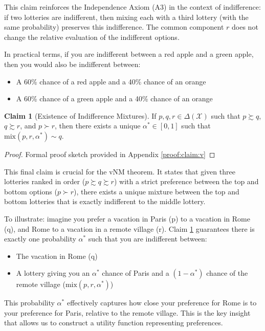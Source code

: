 \documentclass{article}
\theoremstyle{definition}
\newtheorem{claim}{Claim}[section] %
\newcommand{\X}{\mathcal{X}}
\newcommand{\DeltaX}{\Delta(\X)} %
\newcommand{\pref}{\succsim} %
\newcommand{\strictpref}{\succ} %
\newcommand{\indiff}{\sim} %
\newcommand{\mix}{\mathrm{mix}} %
\begin{document}
This claim reinforces the Independence Axiom (A3) in the context of indifference: if two lotteries are indifferent, then mixing each with a third lottery (with the same probability) preserves this indifference. The common component $r$ does not change the relative evaluation of the indifferent options.

In practical terms, if you are indifferent between a red apple and a green apple, then you would also be indifferent between:
\begin{itemize}
    \item A 60\% chance of a red apple and a 40\% chance of an orange
    \item A 60\% chance of a green apple and a 40\% chance of an orange
\end{itemize}

\begin{claim}[Existence of Indifference Mixtures]\label{claim:v}
If $p, q, r \in \DeltaX$ such that $p \pref q$, $q \pref r$, and $p \strictpref r$, then there exists a unique $\alpha^* \in [0, 1]$ such that $\mix(p, r, \alpha^*) \indiff q$.
\end{claim}
\begin{proof}
Formal proof sketch provided in Appendix \ref{proof:claim:v}
\end{proof}

This final claim is crucial for the vNM theorem. It states that given three lotteries ranked in order ($p \pref q \pref r$) with a strict preference between the top and bottom options ($p \strictpref r$), there exists a unique mixture between the top and bottom lotteries that is exactly indifferent to the middle lottery.

To illustrate: imagine you prefer a vacation in Paris (p) to a vacation in Rome (q), and Rome to a vacation in a remote village (r). Claim \ref{claim:v} guarantees there is exactly one probability $\alpha^*$ such that you are indifferent between:
\begin{itemize}
    \item The vacation in Rome (q)
    \item A lottery giving you an $\alpha^*$ chance of Paris and a $(1-\alpha^*)$ chance of the remote village ($\mix(p, r, \alpha^*)$)
\end{itemize}

This probability $\alpha^*$ effectively captures how close your preference for Rome is to your preference for Paris, relative to the remote village. This is the key insight that allows us to construct a utility function representing preferences.
\end{document}
